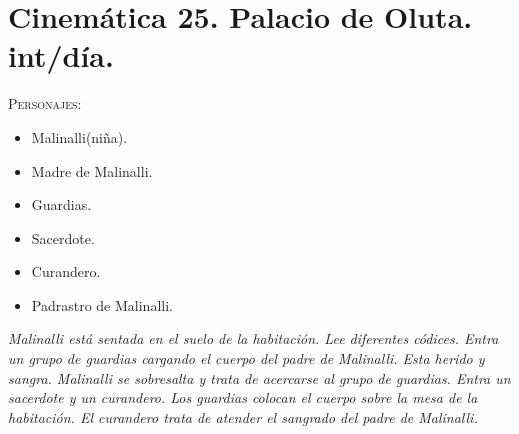 \documentclass[11pt,letterpaper]{article}
\begin{document}
\section{Cinemática 25. Palacio de Oluta. int/día.}
 \textsc{Personajes}:
 \begin{itemize}
 \item Malinalli(niña).
 \item Madre de Malinalli.
\item Guardias.
\item Sacerdote.
\item Curandero.
\item Padrastro de Malinalli.
 \end{itemize}
 \textit{Malinalli está sentada en el suelo de la habitación. Lee diferentes códices. Entra un grupo de guardias cargando el cuerpo del padre de Malinalli. Esta herido y sangra. Malinalli se sobresalta y trata de acercarse al grupo de guardias. Entra un sacerdote y un curandero. Los guardias colocan el cuerpo sobre la mesa de la habitación. El curandero trata de atender el sangrado del padre de Malinalli.}
\end{document}
